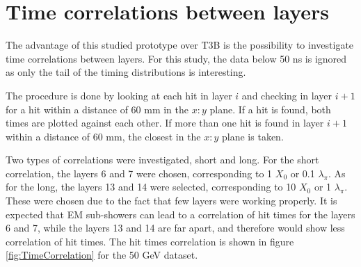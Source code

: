\section{Time correlations between layers}

The advantage of this studied prototype over T3B is the possibility to investigate time correlations between layers. For this study, the data below 50 ns is ignored as only the tail of the timing distributions is interesting.

The procedure is done by looking at each hit in layer $i$ and checking in layer $i+1$ for a hit within a distance of 60 mm in the $x:y$ plane. If a hit is found, both times are plotted against each other. If more than one hit is found in layer $i+1$ within a distance of 60 mm, the closest in the $x:y$ plane is taken.

Two types of correlations were investigated, short and long. For the short correlation, the layers 6 and 7 were chosen, corresponding to 1 $X_0$ or 0.1 $\lambda_{\pi}$. As for the long, the layers 13 and 14 were selected, corresponding to 10 $X_0$ or 1 $\lambda_{\pi}$. These were chosen due to the fact that few layers were working properly. It is expected that EM sub-showers can lead to a correlation of hit times for the layers 6 and 7, while the layers 13 and 14 are far apart, and therefore would show less correlation of hit times. The hit times correlation is shown in figure \ref{fig:TimeCorrelation} for the 50 GeV dataset.

